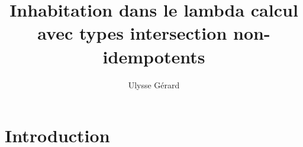 \documentclass[11pt]{article}
\title{\textbf{Inhabitation dans le lambda calcul avec types intersection non-idempotents}}
\author{Ulysse Gérard}
\begin{document}
\maketitle

\section{Introduction}
\end{document}
